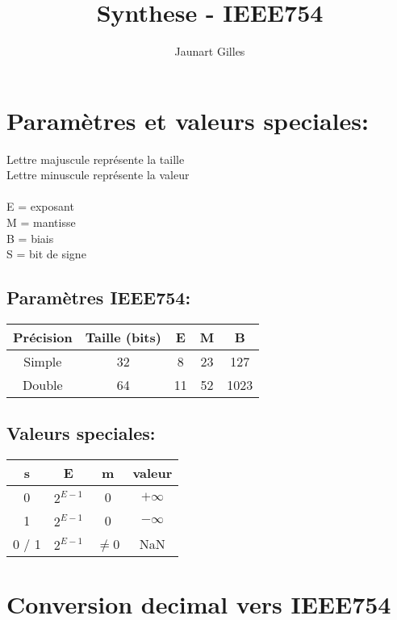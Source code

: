 \documentclass[11pt]{article}
\title{Synthese - IEEE754}
\author{Jaunart Gilles}
\date{}
\begin{document}
\maketitle

\section{Paramètres et valeurs speciales:}

Lettre majuscule représente la taille \\
Lettre minuscule représente la valeur \\
\\
E = exposant \\
M = mantisse \\
B = biais \\
S = bit de signe

\subsection{Paramètres IEEE754:}
\begin{tabular}{|c|c|c|c|c|}
\hline
\textbf{Précision} & \textbf{Taille (bits)} & \textbf{E} & \textbf{M} & \textbf{B} \\ \hline
Simple             & 32                     & 8          & 23         & 127        \\ \hline
Double             & 64                     & 11         & 52         & 1023       \\ \hline
\end{tabular}

\subsection{Valeurs speciales:}
\begin{tabular}{|c|c|c|c|}
\hline
\textbf{s} & \textbf{E} & \textbf{m} & \textbf{valeur} \\ \hline
0          & $2^{E-1}$  & 0          & $+ \infty$      \\ \hline
1          & $2^{E-1}$  & 0          & $- \infty$      \\ \hline
0 / 1      & $2^{E-1}$  & $\neq$0    & NaN             \\ \hline
\end{tabular}

\newpage

\section{Conversion decimal vers IEEE754}
\end{document}
